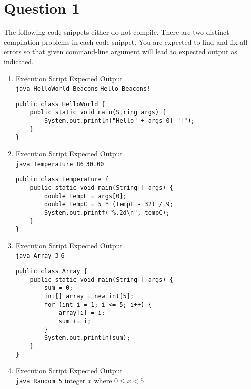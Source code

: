 \documentclass[12pt,letterpaper,twoside]{article}
\begin{document}


\section*{Question 1}

The following code snippets either do not compile.
There are two distinct compilation problems in each code snippet.
You are expected to find and fix all errors so that given command-line argument will lead to expected output as indicated.

\begin{enumerate}[label=\textbf{(\alph*)}]

\item Execution Script \hfill Expected Output\\
\texttt{java HelloWorld Beacons} \hfill \texttt{Hello Beacons!}

\begin{lstlisting}
public class HelloWorld {
	public static void main(String args) {
		System.out.println("Hello" + args[0] "!");
	}
}
\end{lstlisting}

\item Execution Script \hfill Expected Output\\
\texttt{java Temperature 86} \hfill \texttt{30.00}

\begin{lstlisting}
public class Temperature {
	public static void main(String[] args) {
		double tempF = args[0];
		double tempC = 5 * (tempF - 32) / 9;
		System.out.printf("%.2d\n", tempC);
	}
}
\end{lstlisting}

\newpage

\item Execution Script \hfill Expected Output\\
\texttt{java Array 3} \hfill \texttt{6}

\begin{lstlisting}
public class Array {
	public static void main(String[] args) {
		sum = 0;
		int[] array = new int[5];
		for (int i = 1; i <= 5; i++) {
			array[i] = i;
			sum += i;
		}
		System.out.println(sum);
	}
}
\end{lstlisting}

\item Execution Script \hfill Expected Output\\
\texttt{java Random 5} \hfill integer $x$ where $0 \leq x < 5$


\end{enumerate}
\end{document}
